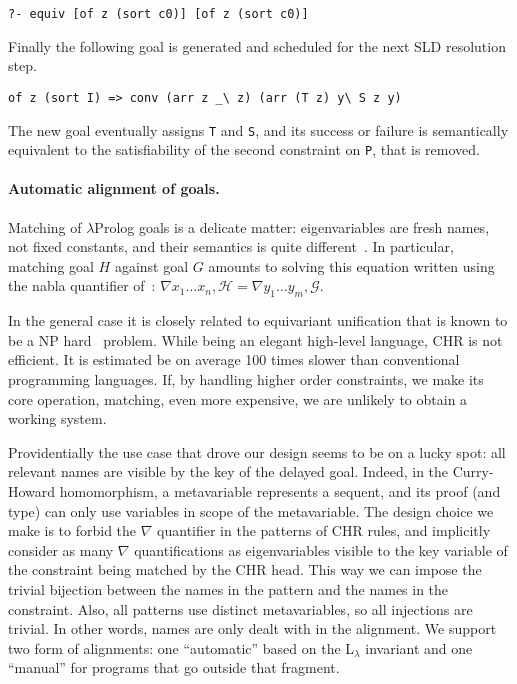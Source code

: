 \documentclass{easychair}
\begin{document}
\begin{Verbatim}
?- equiv [of z (sort c0)] [of z (sort c0)]
\end{Verbatim}

Finally the following  goal is generated and scheduled for the next
SLD resolution step.

\begin{Verbatim}
of z (sort I) => conv (arr z _\ z) (arr (T z) y\ S z y)
\end{Verbatim}

The new goal eventually assigns \verb+T+ and \verb+S+, and its success
or failure is semantically equivalent to the satisfiability of the
second constraint on \verb+P+, that is removed.

\paragraph{Automatic alignment of goals.}
\label{sec:realchr}

Matching of $\lambda$Prolog goals is a delicate matter: eigenvariables
are fresh names, not fixed constants, and their semantics is quite
different~\cite{nabla}.  
In particular, matching goal $H$ against goal $G$ amounts
to solving this equation written using the nabla quantifier of~\cite{nabla}:
$
 \nabla x_1\ldots x_n, \mathcal{H} = \nabla y_1\ldots y_m, \mathcal{G}
$.

In the general case it is closely related to equivariant unification
that is known to be a NP hard~\cite{Cheney2004} problem.  While being
an elegant high-level language, CHR is not efficient.  It is estimated
be on average 100 times slower than conventional programming
languages.  If, by handling higher order constraints, we make its core
operation, matching, even more expensive, we are unlikely to obtain a
working system.

Providentially the use case that drove our design seems to be on a lucky
spot: all relevant names are visible by the key of the delayed goal.
Indeed, in the Curry-Howard homomorphism, a metavariable represents a
sequent, and its proof (and type) can only use variables in scope of
the metavariable.  The design choice we make is to forbid the
$\nabla$ quantifier in the patterns of CHR rules, and implicitly consider as many
$\nabla$ quantifications as eigenvariables visible to the key variable
of the constraint being matched by the CHR head.  This way we can impose
the trivial bijection between the names in the pattern and the names
in the constraint.  Also, all patterns use distinct metavariables, so
all injections are trivial.  In other words, names are only dealt with
in the alignment.
We support two form of alignments: one ``automatic'' based on the
L$_\lambda$ invariant and one ``manual'' for programs that go
outside that fragment.
\end{document}
